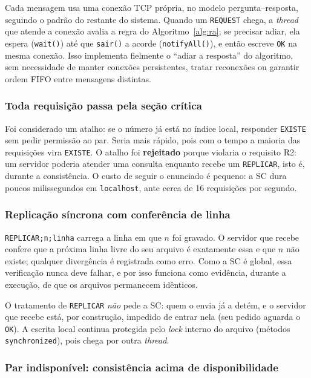\documentclass[11pt,a4paper]{article}
\newcommand{\msg}[1]{\texttt{#1}}
\begin{document}
Cada mensagem usa uma conexão TCP própria, no modelo pergunta--resposta, seguindo o
padrão do restante do sistema. Quando um \msg{REQUEST} chega, a \emph{thread} que
atende a conexão avalia a regra do Algoritmo~\ref{alg:ra}; se precisar adiar, ela
espera (\texttt{wait()}) até que \texttt{sair()} a acorde (\texttt{notifyAll()}),
e então escreve \msg{OK} na mesma conexão. Isso implementa fielmente o ``adiar a
resposta'' do algoritmo, sem necessidade de manter conexões persistentes, tratar
reconexões ou garantir ordem FIFO entre mensagens distintas.

\subsubsection{Toda requisição passa pela seção crítica}

Foi considerado um atalho: se o número já está no índice local, responder
\msg{EXISTE} sem pedir permissão ao par. Seria mais rápido, pois com o tempo a
maioria das requisições vira \msg{EXISTE}. O atalho foi \textbf{rejeitado} porque
violaria o requisito R2: um servidor poderia atender uma consulta enquanto recebe
um \msg{REPLICAR}, isto é, durante a consistência. O custo de seguir o enunciado é
pequeno: a SC dura poucos milissegundos em \texttt{localhost}, ante cerca de 16
requisições por segundo.

\subsubsection{Replicação síncrona com conferência de linha}

\msg{REPLICAR;n;linha} carrega a linha em que $n$ foi gravado. O servidor que recebe
confere que a próxima linha livre do seu arquivo é exatamente essa e que $n$ não
existe; qualquer divergência é registrada como erro. Como a SC é global, essa
verificação nunca deve falhar, e por isso funciona como evidência, durante a
execução, de que os arquivos permanecem idênticos.

O tratamento de \msg{REPLICAR} \emph{não} pede a SC: quem o envia já a detém, e o
servidor que recebe está, por construção, impedido de entrar nela (seu pedido
aguarda o \msg{OK}). A escrita local continua protegida pelo \emph{lock} interno do
arquivo (métodos \texttt{synchronized}), pois chega por outra \emph{thread}.

\subsubsection{Par indisponível: consistência acima de disponibilidade}
\label{sec:cap}
\end{document}
